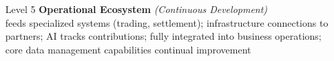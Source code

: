 \begin{itemize}[leftmargin=0.5in,font=\bfseries]
    \item [Level 5] \textbf{Operational Ecosystem} \textit{(Continuous Development)}
    ~\\ feeds specialized systems (trading, settlement);
    infrastructure connections to partners;
    AI tracks contributions;
    fully integrated into business operations;
    core data management capabilities continual improvement\\[0.5em]

\end{itemize}
